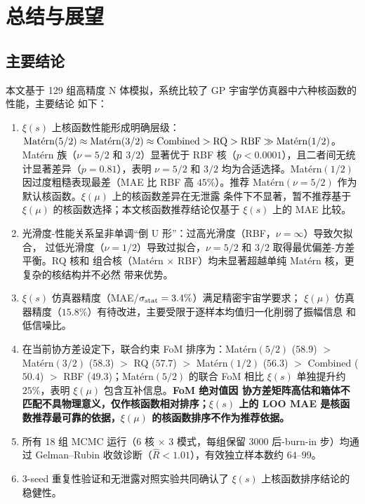 \chapter{总结与展望}\label{chap:conclusion}

\section{主要结论}\label{sec:conclusions}

本文基于 129 组高精度 N 体模拟，系统比较了 GP 宇宙学仿真器中六种核函数的性能，主要结论
如下：

\begin{enumerate}
  \item $\xi(s)$ 上核函数性能形成明确层级：
    $\mathrm{Mat\acute{e}rn}(5/2)\approx\mathrm{Mat\acute{e}rn}(3/2)\approx{\rm Combined}
    > {\rm RQ} > {\rm RBF} \gg \mathrm{Mat\acute{e}rn}(1/2)$。Mat\'ern 族（$\nu=5/2$ 和
    $3/2$）显著优于 RBF 核（$p<0.0001$），且二者间无统计显著差异（$p=0.81$），表明
    $\nu=5/2$ 和 $3/2$ 均为合适选择。Mat\'ern$(1/2)$ 因过度粗糙表现最差（MAE 比 RBF 高
    $45\%$）。推荐 Mat\'ern$(\nu=5/2)$ 作为默认核函数。$\xi(\mu)$ 上的核函数差异在无泄露
    条件下不显著，暂不推荐基于 $\xi(\mu)$ 的核函数选择；本文核函数推荐结论仅基于 $\xi(s)$
    上的 MAE 比较。
  \item 光滑度-性能关系呈非单调``倒 U 形''：过高光滑度（RBF，$\nu=\infty$）导致欠拟合，
    过低光滑度（$\nu=1/2$）导致过拟合，$\nu=5/2$ 和 $3/2$ 取得最优偏差-方差平衡。RQ 核和
    组合核（Mat\'ern $\times$ RBF）均未显著超越单纯 Mat\'ern 核，更复杂的核结构并不必然
    带来优势。
  \item $\xi(s)$ 仿真器精度（MAE/$\sigma_{\rm stat}=3.4\%$）满足精密宇宙学要求；
    $\xi(\mu)$ 仿真器精度（$15.8\%$）有待改进，主要受限于逐样本均值归一化削弱了振幅信息
    和低信噪比。
  \item 在当前协方差设定下，联合约束 FoM 排序为：Mat\'ern$(5/2)$ ($58.9$) ${}>{}$
    Mat\'ern$(3/2)$ ($58.3$) ${}>{}$ RQ ($57.7$) ${}>{}$ Mat\'ern$(1/2)$ ($56.3$)
    ${}>{}$ Combined ($50.4$) ${}>{}$ RBF ($49.3$)；Mat\'ern$(5/2)$ 的联合 FoM 相比
    $\xi(s)$ 单独提升约 $25\%$，表明 $\xi(\mu)$ 包含互补信息。\textbf{FoM 绝对值因
    协方差矩阵高估和箱体不匹配不具物理意义，仅作核函数相对排序；$\xi(s)$ 上的 LOO MAE
    是核函数推荐最可靠的依据，$\xi(\mu)$ 的核函数排序不作为推荐依据。}
  \item 所有 18 组 MCMC 运行（6 核 $\times$ 3 模式，每组保留 3000 后-burn-in 步）均通过
    Gelman--Rubin 收敛诊断（$\hat R<1.01$），有效独立样本数约 $64$--$99$。
  \item 3-seed 重复性验证和无泄露对照实验共同确认了 $\xi(s)$ 上核函数排序结论的稳健性。
\end{enumerate}


